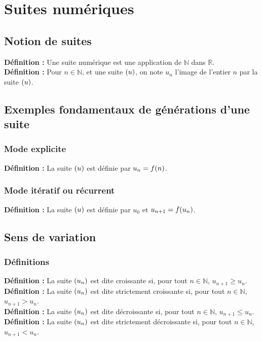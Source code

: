 \documentclass[a4paper,titlepage]{article}
\let\oldsection\section
\renewcommand\section{\clearpage\oldsection}
\let\oldleft\left
\renewcommand{\left}{\mathopen{}\mathclose\bgroup\oldleft}
\let\oldright\right
\renewcommand{\right}{\aftergroup\egroup\oldright}
\begin{document}
\section{Suites numériques}
    \subsection{Notion de suites}
        \textbf{Définition :} Une suite numérique est une application de $\mathbb{N}$ dans $\mathbb{R}$.
        \\
        \textbf{Définition :} Pour $n\in\mathbb{N}$, et une suite $\left(u\right)$, on note $u_{n}$ l’image de l’entier $n$ par la suite $\left(u\right)$.
    \subsection{Exemples fondamentaux de générations d’une suite}
        \subsubsection{Mode explicite}
            \textbf{Définition :} La suite $\left(u\right)$ est définie par $u_{n}=f\left(n\right)$.
        \subsubsection{Mode itératif ou récurrent}
            \textbf{Définition :} La suite $\left(u\right)$ est définie par $u_{0}$ et $u_{n+1}=f\left(u_{n}\right)$.
    \subsection{Sens de variation}
        \subsubsection{Définitions}
            \textbf{Définition :} La suite $\left(u_{n}\right)$ est dite croissante si, pour tout $n\in\mathbb{N}$, $u_{n+1}\geqslant u_{n}$.
            \\
            \textbf{Définition :} La suite $\left(u_{n}\right)$ est dite strictement croissante si, pour tout $n\in\mathbb{N}$, $u_{n+1}>u_{n}$.
            \\
            \textbf{Définition :} La suite $\left(u_{n}\right)$ est dite décroissante si, pour tout $n\in\mathbb{N}$, $u_{n+1}\leqslant u_{n}$.
            \\
            \textbf{Définition :} La suite $\left(u_{n}\right)$ est dite strictement décroissante si, pour tout $n\in\mathbb{N}$, $u_{n+1}<u_{n}$.
\end{document}
